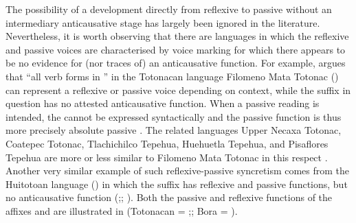 The possibility of a development directly from reflexive to passive without an intermediary anticausative stage has largely been ignored in the literature. Nevertheless, it is worth observing that there are languages in which the reflexive and passive voices are characterised by voice marking for which there appears to be no evidence for (nor traces of) an anticausative function. For example, \citet[188]{mcfarland:2009} argues that “all verb forms in ” in the Totonacan language Filomeno Mata Totonac () can represent a reflexive or passive voice depending on context, while the suffix in question has no attested anticausative function. When a passive reading is intended, the  cannot be expressed syntactically and the passive function is thus more precisely absolute passive \citep[188]{mcfarland:2009}. The related languages Upper Necaxa Totonac, Coatepec Totonac, Tlachichilco Tepehua, Huehuetla Tepehua, and Pisaflores Tepehua are more or less similar to Filomeno Mata Totonac in this respect \citep[22ff.]{beck:nd}. Another very similar example of such reflexive-passive syncretism comes from the Huitotoan language  () in which the suffix  has reflexive and passive functions, but no anticausative function (\citealt[147f.]{thiesen:weber:2012};; \citealt[1499f.]{seifart:2015}). Both the passive and reflexive functions of the affixes  and  are illustrated in  (Totonacan = \citealt[22ff.]{beck:nd};; Bora = \citealt[148]{thiesen:weber:2012}).

